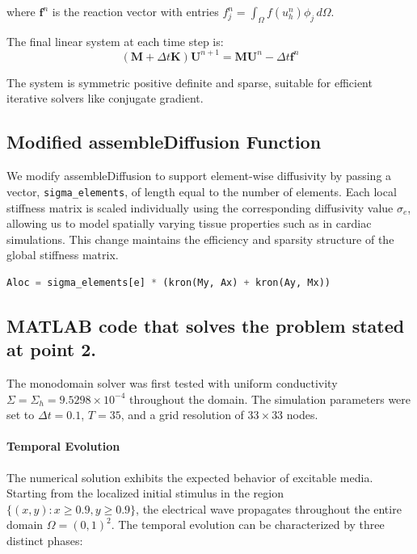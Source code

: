 \documentclass[12pt,a4paper]{article}
\begin{document}
where $\mathbf{f}^n$ is the reaction vector with entries $f_j^n = \int_\Omega f(u_h^n) \phi_j \, d\Omega$.

The final linear system at each time step is:
\begin{equation}
(\mathbf{M} + \Delta t \mathbf{K}) \mathbf{U}^{n+1} = \mathbf{M} \mathbf{U}^n - \Delta t \mathbf{f}^n
\end{equation}

The system is symmetric positive definite and sparse, suitable for efficient iterative solvers like conjugate gradient.

\subsection{Modified assembleDiffusion Function}

We modify assembleDiffusion to support element-wise diffusivity by passing a vector, \texttt{sigma\_elements}, of length equal to the number of elements. Each local stiffness matrix is scaled individually using the corresponding diffusivity value $\sigma_e$, allowing us to model spatially varying tissue properties such as in cardiac simulations. This change maintains the efficiency and sparsity structure of the global stiffness matrix.

\begin{lstlisting}[language=Python]
Aloc = sigma_elements[e] * (kron(My, Ax) + kron(Ay, Mx))
\end{lstlisting}

\subsection{MATLAB code that solves the problem stated at point 2.}
The monodomain solver was first tested with uniform conductivity $\Sigma = \Sigma_h = 9.5298 \times 10^{-4}$ throughout the domain. The simulation parameters were set to $\Delta t = 0.1$, $T = 35$, and a grid resolution of $33 \times 33$ nodes.

\paragraph{Temporal Evolution}
The numerical solution exhibits the expected behavior of excitable media. Starting from the localized initial stimulus in the region $\{(x,y) : x \geq 0.9, y \geq 0.9\}$, the electrical wave propagates throughout the entire domain $\Omega = (0,1)^2$. The temporal evolution can be characterized by three distinct phases:
\end{document}
